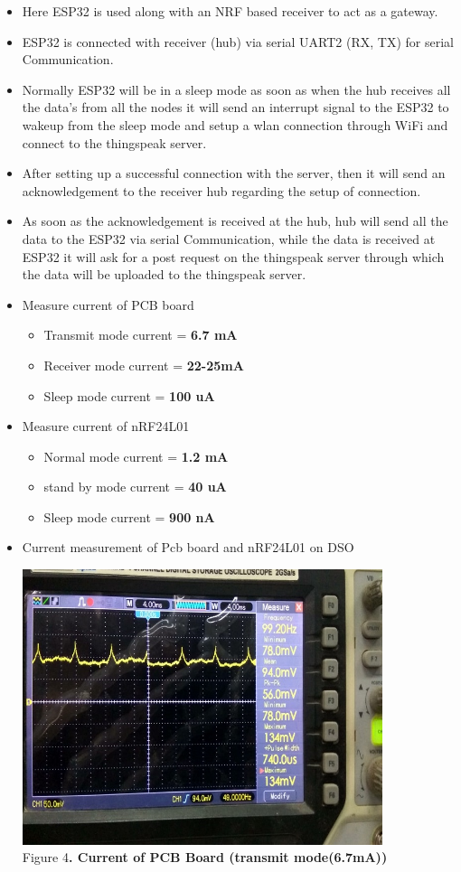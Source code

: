 \documentclass[a4paper,12pt,oneside]{book}
\begin{document}
\begin{itemize}
\item Here ESP32 is used along with an NRF based receiver to act as a gateway. 
\item ESP32 is connected with receiver (hub) via serial UART2 (RX, TX) for serial Communication. 
\item Normally ESP32 will be in a sleep mode as soon as when the hub receives all the data's from all  the nodes it will send an interrupt signal to the ESP32 to wakeup from the sleep mode and setup a wlan connection through WiFi and connect to the thingspeak server. 
\item After setting up a successful connection with the server, then it will send an acknowledgement to the receiver hub regarding the setup of connection. 
\item As soon as the acknowledgement is received at the hub, hub will send all the data to the ESP32 via serial Communication, while the data is received at ESP32 it will ask for a post request on the thingspeak server through which the data will be uploaded to the thingspeak server.
    \item Measure current of PCB board
    \begin{itemize}
    	\item Transmit mode current = \textbf{6.7 mA}
        \item Receiver mode current = \textbf{22-25mA}
        \item Sleep mode current = \textbf{100 uA}
       
    \end{itemize}
    \item Measure current of nRF24L01
    \begin{itemize}
    	\item Normal mode current = \textbf{1.2 mA}  
        \item stand by mode current = \textbf{40 uA}
        \item Sleep mode current = \textbf{900 nA}
    \end{itemize}
    \clearpage
    \item Current measurement of Pcb board and nRF24L01 on DSO
     \begin{center}
     \includegraphics[width=0.83\textwidth]{main_transmitt.PNG}\\
         \small{Figure 4\textbf{. Current of PCB Board (transmit mode(6.7mA))}}
         

\end{center}
\end{itemize}
\end{document}
